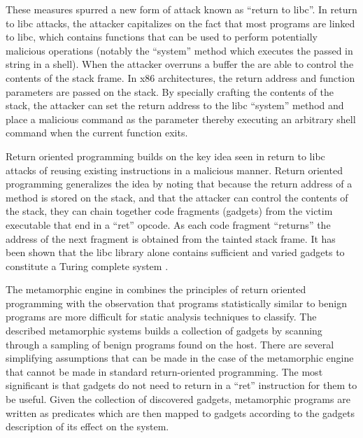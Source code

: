 \documentclass[finalcopy,short]{srpaper}
\begin{document}
  These measures spurred a new form of attack known as ``return to libc''. In
  return to libc attacks, the attacker capitalizes on the fact that most
  programs are linked to libc, which contains functions that can be used to
  perform potentially malicious operations (notably the ``system'' method which
  executes the passed in string in a shell). When the attacker overruns a buffer
  the are able to control the contents of the stack frame. In x86 architectures,
  the return address and function parameters are passed on the stack. By
  specially crafting the contents of the stack, the attacker can set the return
  address to the libc ``system'' method and place a malicious command as the
  parameter thereby executing an arbitrary shell command when the current
  function exits.

  Return oriented programming builds on the key idea seen in return to libc
  attacks of reusing existing instructions in a malicious manner. Return
  oriented programming generalizes the idea by noting that because the return
  address of a method is stored on the stack, and that the attacker can control
  the contents of the stack, they can chain together code fragments (gadgets)
  from the victim executable that end in a ``ret'' opcode. As each code fragment
  ``returns'' the address of the next fragment is obtained from the tainted
  stack frame.  It has been shown that the libc library alone contains
  sufficient and varied gadgets to constitute a Turing complete system
  \cite{rop_geo}.

  The metamorphic engine in \cite{franken} combines the principles of return
  oriented programming with the observation that programs statistically similar
  to benign programs are more difficult for static analysis techniques to
  classify. The described metamorphic systems builds a collection of gadgets by
  scanning through a sampling of benign programs found on the host. There are
  several simplifying assumptions that can be made in the case of the
  metamorphic engine that cannot be made in standard return-oriented
  programming. The most significant is that gadgets do not need to return in a
  ``ret'' instruction for them to be useful. Given the collection of discovered
  gadgets, metamorphic programs are written as predicates which are then mapped
  to gadgets according to the gadgets description of its effect on the system.

   
\end{document}
